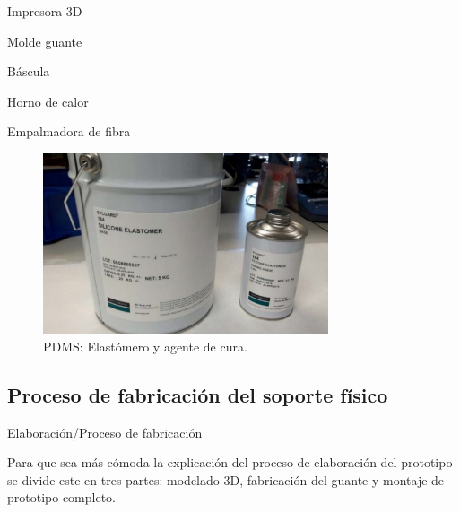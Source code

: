 Impresora 3D

Molde guante

Báscula

Horno de calor

Empalmadora de fibra 


\begin{figure}[H]
	\centering
	\includegraphics[width=0.75\textwidth]{./img/PDMS}
	\caption{PDMS: Elastómero y agente de cura.} \label{fig:pdms}
\end{figure}


\subsection{Proceso de fabricación del soporte físico}
\label{sec:proceso3}

Elaboración/Proceso de fabricación

Para que sea más cómoda la explicación del proceso de elaboración del prototipo se divide este en tres partes: modelado 3D, fabricación del guante y montaje de prototipo completo.

